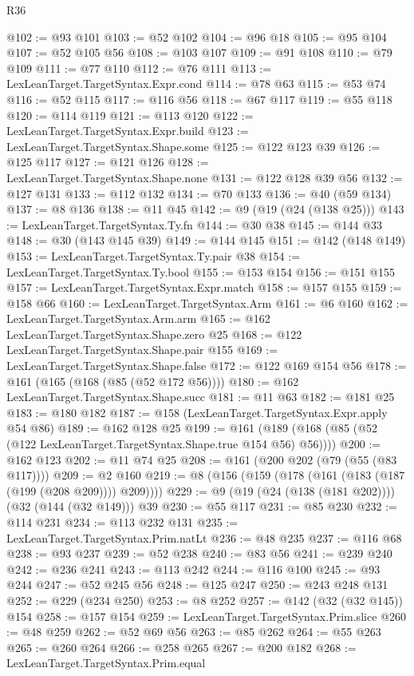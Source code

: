 \begin{lexlean}{R36}
\begin{coremodule}
@102 := @93 @101
@103 := @52 @102
@104 := @96 @18
@105 := @95 @104
@107 := @52 @105 @56
@108 := @103 @107
@109 := @91 @108
@110 := @79 @109
@111 := @77 @110
@112 := @76 @111
@113 := LexLeanTarget.TargetSyntax.Expr.cond
@114 := @78 @63
@115 := @53 @74
@116 := @52 @115
@117 := @116 @56
@118 := @67 @117
@119 := @55 @118
@120 := @114 @119
@121 := @113 @120
@122 := LexLeanTarget.TargetSyntax.Expr.build
@123 := LexLeanTarget.TargetSyntax.Shape.some
@125 := @122 @123 @39
@126 := @125 @117
@127 := @121 @126
@128 := LexLeanTarget.TargetSyntax.Shape.none
@131 := @122 @128 @39 @56
@132 := @127 @131
@133 := @112 @132
@134 := @70 @133
@136 := @40 (@59 @134)
@137 := @8 @136
@138 := @11 @45
@142 := @9 (@19 (@24 (@138 @25)))
@143 := LexLeanTarget.TargetSyntax.Ty.fn
@144 := @30 @38
@145 := @144 @33
@148 := @30 (@143 @145 @39)
@149 := @144 @145
@151 := @142 (@148 @149)
@153 := LexLeanTarget.TargetSyntax.Ty.pair @38
@154 := LexLeanTarget.TargetSyntax.Ty.bool
@155 := @153 @154
@156 := @151 @155
@157 := LexLeanTarget.TargetSyntax.Expr.match
@158 := @157 @155
@159 := @158 @66
@160 := LexLeanTarget.TargetSyntax.Arm
@161 := @6 @160
@162 := LexLeanTarget.TargetSyntax.Arm.arm
@165 := @162 LexLeanTarget.TargetSyntax.Shape.zero @25
@168 := @122 LexLeanTarget.TargetSyntax.Shape.pair @155
@169 := LexLeanTarget.TargetSyntax.Shape.false
@172 := @122 @169 @154 @56
@178 := @161 (@165 (@168 (@85 (@52 @172 @56))))
@180 := @162 LexLeanTarget.TargetSyntax.Shape.succ
@181 := @11 @63
@182 := @181 @25
@183 := @180 @182
@187 := @158 (LexLeanTarget.TargetSyntax.Expr.apply @54 @86)
@189 := @162 @128 @25
@199 := @161 (@189 (@168 (@85 (@52 (@122 LexLeanTarget.TargetSyntax.Shape.true @154 @56) @56))))
@200 := @162 @123
@202 := @11 @74 @25
@208 := @161 (@200 @202 (@79 (@55 (@83 @117))))
@209 := @2 @160
@219 := @8 (@156 (@159 (@178 (@161 (@183 (@187 (@199 (@208 @209)))) @209))))
@229 := @9 (@19 (@24 (@138 (@181 @202)))) (@32 (@144 (@32 @149))) @39
@230 := @55 @117
@231 := @85 @230
@232 := @114 @231
@234 := @113 @232 @131
@235 := LexLeanTarget.TargetSyntax.Prim.natLt
@236 := @48 @235
@237 := @116 @68
@238 := @93 @237
@239 := @52 @238
@240 := @83 @56
@241 := @239 @240
@242 := @236 @241
@243 := @113 @242
@244 := @116 @100
@245 := @93 @244
@247 := @52 @245 @56
@248 := @125 @247
@250 := @243 @248 @131
@252 := @229 (@234 @250)
@253 := @8 @252
@257 := @142 (@32 (@32 @145)) @154
@258 := @157 @154
@259 := LexLeanTarget.TargetSyntax.Prim.slice
@260 := @48 @259
@262 := @52 @69 @56
@263 := @85 @262
@264 := @55 @263
@265 := @260 @264
@266 := @258 @265
@267 := @200 @182
@268 := LexLeanTarget.TargetSyntax.Prim.equal

\end{coremodule}
\end{lexlean}
